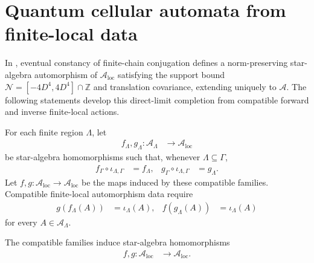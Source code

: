 \section{Quantum cellular automata from finite-local data}

In \cite[lines~2300--2306]{Cirac2017MPU}, eventual constancy of finite-chain
conjugation defines a norm-preserving star-algebra automorphism of
$\mathcal A_{\mathrm{loc}}$ satisfying the support bound
$\mathcal N=[-4D^4,4D^4]\cap\mathbb Z$ and translation covariance, extending
uniquely to $\mathcal A$. The following statements develop this direct-limit
completion from compatible forward and inverse finite-local actions.

\begin{definition}
    \label{def:qca_compatible_local_automorphism}
    \leanok
    For each finite region $\Lambda$, let
    \begin{align}
        f_\Lambda,g_\Lambda\colon\mathcal A_\Lambda
         & \longrightarrow\mathcal A_{\mathrm{loc}}
    \end{align}
    be star-algebra homomorphisms such that, whenever
    $\Lambda\subseteq\Gamma$,
    \begin{align}
        f_\Gamma\circ\iota_{\Lambda,\Gamma} & =f_\Lambda, &
        g_\Gamma\circ\iota_{\Lambda,\Gamma} & =g_\Lambda.
    \end{align}
    Let $f,g\colon\mathcal A_{\mathrm{loc}}\to
        \mathcal A_{\mathrm{loc}}$ be the maps induced by these compatible
    families.  Compatible finite-local automorphism data require
    \begin{align}
        g(f_\Lambda(A)) & =\iota_\Lambda(A), &
        f(g_\Lambda(A)) & =\iota_\Lambda(A)
    \end{align}
    for every $A\in\mathcal A_\Lambda$.
\end{definition}

\begin{definition}
    \label{def:qca_compatible_local_homs}
    \leanok
    The compatible families induce star-algebra homomorphisms
    \begin{align}
        f,g\colon\mathcal A_{\mathrm{loc}}
         & \longrightarrow\mathcal A_{\mathrm{loc}}.
    \end{align}
\end{definition}

